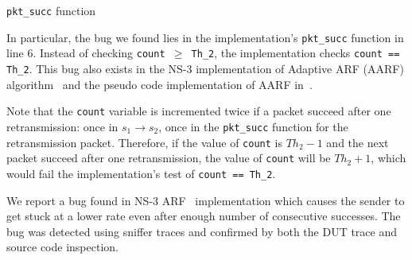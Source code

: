 \begin{algorithm}[t!]
  \caption{\texttt{pkt\_succ} function}
  \label{alg:pkt_succ}
  \begin{algorithmic}[1]
    \EndIf
    \EndFunction
  \end{algorithmic}
\end{algorithm}

In particular, the bug we found lies in the implementation's \texttt{pkt\_succ}
function in line 6. Instead of checking \texttt{count $\ge$ Th\_2}, the
implementation checks \texttt{count == Th\_2}. This bug also exists in the NS-3
implementation of Adaptive ARF (AARF) algorithm~\cite{lacage2004ieee} and the
pseudo code implementation of AARF in~\cite{lacage2004report}.

Note that the \texttt{count} variable is incremented twice if a packet succeed
after one retransmission: once in $s_1\rightarrow s_2$, once in the
\texttt{pkt\_succ} function for the retransmission packet. Therefore, if the
value of \texttt{count} is $Th_2-1$ and the next packet succeed after one
retransmission, the value of \texttt{count} will be $Th_2+1$, which would fail
the implementation's test of \texttt{count == Th\_2}.

We report a bug found in NS-3 ARF~\cite{kamerman1997wavelan} implementation
which causes the sender to get stuck at a lower rate even after enough number of
consecutive successes. The bug was detected using sniffer traces and
confirmed by both the DUT trace and source code inspection.
